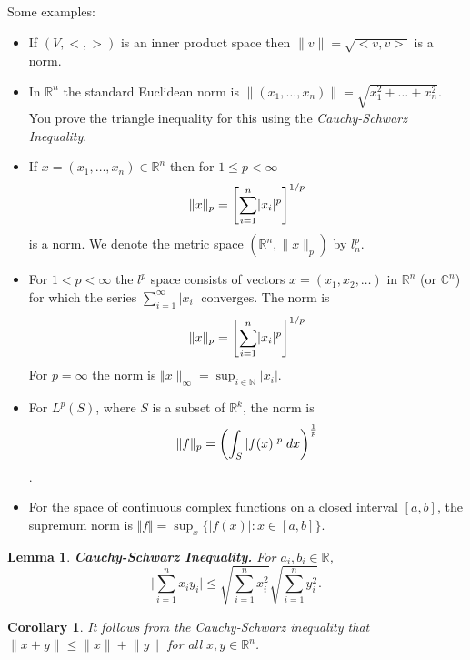 \documentclass[two column]{article}
\newtheorem{lemma}[theorem]{Lemma}
\newtheorem{corollary}[theorem]{Corollary}
\begin{document}
Some examples:
\begin{itemize}
\item If $\left(V, <,> \right)$ is an inner product space then $\lVert v \rVert = \sqrt{< v,v>}$ is a norm.
\item In $\mathbb{R}^{n}$ the standard Euclidean norm is $\lVert (x_{1}, \dots, x_{n}) \rVert = \sqrt{x_{1}^{2} + \dots + x_{n}^{2}}$. You prove the triangle inequality for this using the \emph{Cauchy-Schwarz Inequality}.
\item If $x = (x_{1}, \dots, x_{n}) \in \mathbb{R}^{n}$ then for $1 \leq p < \infty$ \vspace{-5pt}
\[ \lVert x \rVert_{p} = \left[ \sum_{i=1}^{n} \lvert x_{i} \rvert^{p} \right]^{1/p} \vspace{-5pt} \]
is a norm. We denote the metric space $(\mathbb{R}^{n}, \lVert x \rVert_{p})$ by $l_{n}^{p}$. 
\item For $1 < p < \infty$ the $l^{p}$ space consists of vectors $x = (x_{1}, x_{2}, \dots )$ in $\mathbb{R}^{n}$ (or $\mathbb{C}^{n}$) for which the series $\sum_{i=1}^{\infty} \vert x_{i} \vert$ converges. The norm is \vspace{-10pt}
\[
\Vert x \rVert_{p} = \left[ \sum_{i=1}^{n} \lvert x_{i} \rvert^{p} \right]^{1/p} \vspace{-5pt}
\]
For $p = \infty$ the norm is $\Vert x \rVert_{\infty} = \sup_{i \in \mathbb{N}} \vert x_{i} \vert$. 
\item For $L^{p}(S)$, where $S$ is a subset of $\mathbb{R}^{k}$, the norm is \vspace{-5pt}
\[
\Vert f \Vert_{p} = \left( \int_{S} \vert f(x) \vert^{p} \; dx\right)^{\frac{1}{p}} \vspace{-5pt}
\].
\item For the space of continuous complex functions on a closed interval $[a,b]$, the supremum norm is $\Vert f \Vert = \sup_{x} \{ \vert f(x) \vert : x \in [a,b] \}$. \\
\end{itemize}

\begin{lemma} \label{C-S inequality}
{\bf Cauchy-Schwarz Inequality.} For $a_{i}, b_{i} \in \mathbb{R}$, 
\[ \lvert \sum_{i=1}^{n} x_{i} y_{i} \rvert \leq \sqrt{\sum_{i=1}^{n} x_{i}^{2}} \sqrt{\sum_{i=1}^{n} y_{i}^{2}}. \]
\end{lemma}

\begin{corollary}
It follows from the Cauchy-Schwarz inequality that $\lVert x + y \rVert \leq \lVert x \rVert + \lVert y \rVert$ for all $x,y \in \mathbb{R}^{n}$.\\ 
\end{corollary}
\end{document}
